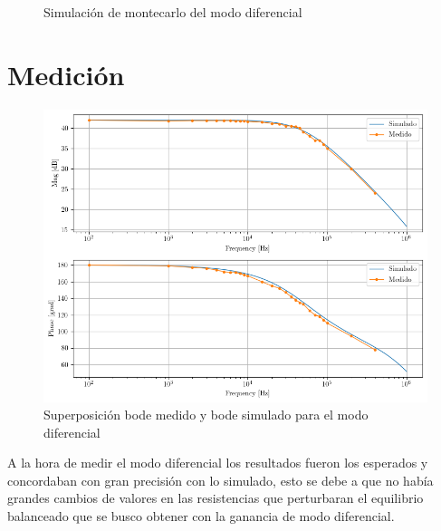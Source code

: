 \begin{center}
	\begin{figure}[H]	
	\caption{Simulación de montecarlo del modo diferencial}
	\label{fig:montecarlodiferencial}
	\end{figure}
\end{center}


\section{Medición}

\begin{figure}[H]
\centering
\includegraphics[scale=0.6]{../Ex3/Bode-DIFerencial.png}
\caption{Superposición bode medido y bode simulado para el modo diferencial}
\label{fig:bodemedidodif}
\end{figure}

A la hora de medir el modo diferencial los resultados fueron los esperados y concordaban con gran precisión con lo simulado, esto se debe a que no había grandes cambios de valores en las resistencias que perturbaran el equilibrio balanceado que se busco obtener con la ganancia de modo diferencial.

